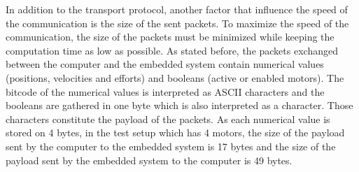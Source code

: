 In addition to the transport protocol, another factor that influence the speed of the communication is the size of the sent packets. To maximize the speed of the communication, the size of the packets must be minimized while keeping the computation time as low as possible. As stated before, the packets exchanged between the computer and the embedded system contain numerical values (positions, velocities and efforts) and booleans (active or enabled motors). The bitcode of the numerical values is interpreted as ASCII characters and the booleans are gathered in one byte which is also interpreted as a character. Those characters constitute the payload of the packets. As each numerical value is stored on 4 bytes, in the test setup which has 4 motors, the size of the payload sent by the computer to the embedded system is 17 bytes and the size of the payload sent by the embedded system to the computer is 49 bytes.

